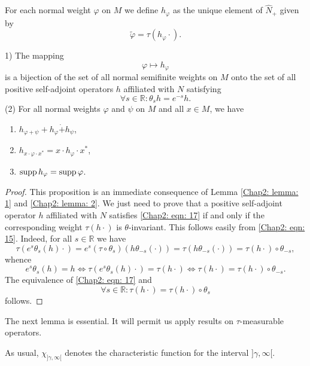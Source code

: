 \begin{definition}
    For each normal weight $\varphi$ on $M$ we define $h_\varphi$ as the unique element of $\hat{N}_+$ given by 
   \begin{equation}
       \tilde{\varphi}=\tau(h_\varphi\cdot).
   \end{equation}
\end{definition}
\begin{proposition}\label{Chap2: Prop: 4}
    1) The mapping 
\[
    \varphi\mapsto h_\varphi
\]
is a bijection of the set of all normal semifinite weights on $M$ onto the set of all positive self-adjoint operators $h$ affiliated with $N$ satisfying
\begin{equation}\label{Chap2: eqn: 17}
    \forall s\in \mathbb{R}:\theta_sh=e^{-s}h.
\end{equation}
(2) For all normal weights $\varphi$ and $\psi$ on $M$ and all $x\in M$, we have
\begin{enumerate}
    \item $h_{\varphi+\psi}+h_\varphi\dot{+}h_\psi$,
    \item $h_{x\cdot \varphi \cdot x^*}=x\cdot h_\varphi\cdot x^*$,
    \item $\operatorname{supp} h_\varphi=\operatorname{supp}\varphi$.
\end{enumerate}
\end{proposition}
\begin{proof}
    This proposition is an immediate consequence of Lemma \ref{Chap2: lemma: 1} and \ref{Chap2: lemma: 2}. We just need to prove that a positive self-adjoint operator $h$ affiliated with $N$ satisfies \eqref{Chap2: eqn: 17} if and only if the corresponding weight $\tau(h\cdot)$ is $\theta$-invariant. This follows easily from \eqref{Chap2: eqn: 15}. Indeed, for all $s\in \mathbb{R}$ we have
    \[
        \tau(e^s\theta_s(h)\cdot)=e^s(\tau\circ \theta_s)(h\theta_{-s}(\cdot))=\tau(h\theta_{-s}(\cdot))=\tau(h\cdot )\circ \theta_{-s},
    \]
    whence 
    \[
      e^s\theta_s(h)=h\Leftrightarrow \tau(e^s\theta_s(h)\cdot)=\tau(h\cdot)\Leftrightarrow \tau(h\cdot)=\tau(h\cdot)\circ \theta_{-s}.  
    \]
    The equivalence of \eqref{Chap2: eqn: 17} and
    \[
        \forall s\in \mathbb{R}:\tau(h\cdot)=\tau(h\cdot)\circ \theta_s    
    \]
    follows.
\end{proof}
The next lemma is essential. It will permit us apply results on $\tau$-measurable operators.\par
As usual, $\chi_{]\gamma,\infty[}$ denotes the characteristic function for the interval $]\gamma,\infty[$.
